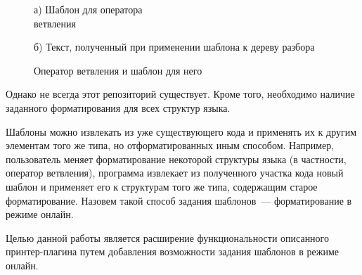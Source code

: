 % 	


\begin{figure}[ht]
\noindent\begin{minipage}{.5\textwidth}
    
\caption*{а) Шаблон для оператора\\
ветвления}    
\end{minipage}\hfill
\begin{minipage}{.5\textwidth}
    
\caption*{б) Текст, полученный при применении шаблона к дереву разбора}    
\end{minipage}
\caption{Оператор ветвления и шаблон для него}    
\label{fig:tmpltcodeintro}
\end{figure}

Однако не всегда этот репозиторий существует. Кроме того, необходимо наличие заданного форматирования для всех структур языка.

Шаблоны можно извлекать из уже существующего кода и применять их к другим элементам того же типа, но отформатированных иным способом. 
Например, пользователь меняет форматирование некоторой структуры языка (в частности, оператор ветвления), программа извлекает из полученного участка кода новый шаблон и применяет его к структурам того же типа, содержащим старое форматирование. 
Назовем такой способ задания шаблонов~--- форматирование в режиме
онлайн.

Целью данной работы является расширение функциональности описанного 
принтер-плагина путем добавления возможности задания шаблонов в режиме онлайн. 
